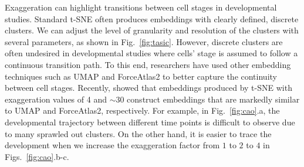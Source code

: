 \documentclass[article]{jss}
\begin{document}
Exaggeration can highlight transitions between cell stages in developmental studies. Standard t-SNE often produces embeddings with clearly defined, discrete clusters. We can adjust the level of granularity and resolution of the clusters with several parameters, as shown in Fig.~\ref{fig:tasic}. However, discrete clusters are often undesired in developmental studies where cells' stage is assumed to follow a continuous transition path. To this end, researchers have used other embedding techniques such as UMAP and ForceAtlas2 to better capture the continuity between cell stages. Recently, \citet{bohm2020unifying} showed that embeddings produced by t-SNE with exaggeration values of 4 and $\sim30$ construct embeddings that are markedly similar to UMAP and ForceAtlas2, respectively. For example, in Fig.~\ref{fig:cao}.a, the developmental trajectory between different time points is difficult to observe due to many sprawled out clusters. On the other hand, it is easier to trace the development when we increase the exaggeration factor from $1$ to $2$ to $4$ in Figs.~\ref{fig:cao}.b-c.
\end{document}
